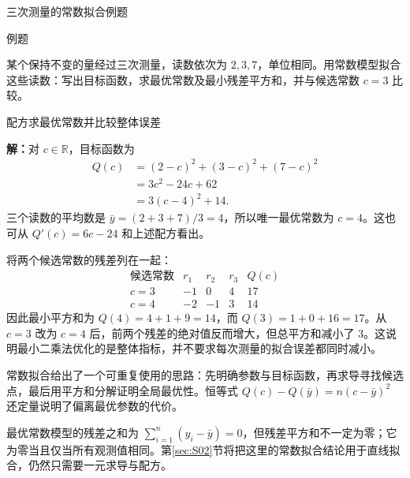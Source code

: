 \documentclass[aspectratio=169,10pt,fontset=fandol]{ctexbeamer}
\begin{document}
\begin{frame}[t,fragile]{三次测量的常数拟合例题}
\normalsize
\begin{block}{例题}
{\normalsize
某个保持不变的量经过三次测量，读数依次为 $2,3,7$，单位相同。用常数模型拟合这些读数：写出目标函数，求最优常数及最小残差平方和，并与候选常数 $c=3$ 比较。

}
\end{block}
\end{frame}
\begin{frame}[t,fragile]{配方求最优常数并比较整体误差}
\small
{\small
\par\noindent\textbf{解：}对 $c\in\mathbb{R}$，目标函数为
\[
\begin{aligned}
Q(c)&=(2-c)^2+(3-c)^2+(7-c)^2\\
&=3c^2-24c+62\\
&=3(c-4)^2+14.
\end{aligned}
\]
三个读数的平均数是 $\bar{y}=(2+3+7)/3=4$，所以唯一最优常数为 $c=4$。这也可从 $Q'(c)=6c-24$ 和上述配方看出。


}
{\small
将两个候选常数的残差列在一起：
\[
\begin{array}{c|rrr|r}
\text{候选常数}&r_1&r_2&r_3&Q(c)\\ \hline
c=3&-1&0&4&17\\
c=4&-2&-1&3&14
\end{array}
\]
因此最小平方和为 $Q(4)=4+1+9=14$，而 $Q(3)=1+0+16=17$。从 $c=3$ 改为 $c=4$ 后，前两个残差的绝对值反而增大，但总平方和减小了 $3$。这说明最小二乘法优化的是整体指标，并不要求每次测量的拟合误差都同时减小。\par

}
{\small
常数拟合给出了一个可重复使用的思路：先明确参数与目标函数，再求导寻找候选点，最后用平方和分解证明全局最优性。恒等式 $Q(c)-Q(\bar{y})=n(c-\bar{y})^2$ 还定量说明了偏离最优参数的代价。


}
{\small
最优常数模型的残差之和为 $\sum_{i=1}^{n}(y_i-\bar{y})=0$，但残差平方和不一定为零；它为零当且仅当所有观测值相同。第\ref{sec:S02}节将把这里的常数拟合结论用于直线拟合，仍然只需要一元求导与配方。\par

}
\end{frame}
\end{document}
